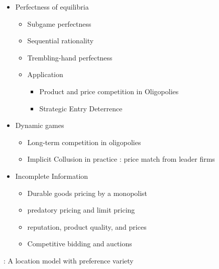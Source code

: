 \documentclass[
]{book}
\begin{document}
\begin{itemize}
\begin{itemize}
    \begin{itemize}
    \item
      first mover advantage
    \item
      deterrent strategy
    \item
      optimal for entrants or incumbents
    \end{itemize}
  \item
    Channels
  \end{itemize}
\item
  Perfectness of equilibria

  \begin{itemize}
  \item
    Subgame perfectness
  \item
    Sequential rationality
  \item
    Trembling-hand perfectness
  \item
    Application

    \begin{itemize}
    \item
      Product and price competition in Oligopolies
    \item
      Strategic Entry Deterrence
    \end{itemize}
  \end{itemize}
\item
  Dynamic games

  \begin{itemize}
  \item
    Long-term competition in oligopolies
  \item
    Implicit Collusion in practice : price match from leader firms
  \end{itemize}
\item
  Incomplete Information

  \begin{itemize}
  \item
    Durable goods pricing by a monopolist
  \item
    predatory pricing and limit pricing
  \item
    reputation, product quality, and prices
  \item
    Competitive bidding and auctions
  \end{itemize}
\end{itemize}

\citep{kim2006}: A location model with preference variety

\citep{hotelling1929}
\end{document}
